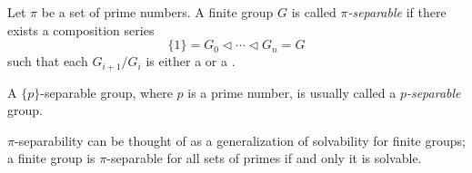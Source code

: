 \documentclass[12pt]{article}
\begin{document}
Let $\pi$ be a set of prime numbers.
A finite group $G$ is called \emph{$\pi$-separable}
if there exists a composition series
\[
  \{1\}=G_0\lhd\cdots\lhd G_n=G
\]
such that each $G_{i+1}/G_i$ is either
a 
or a .

A $\{p\}$-separable group, where $p$ is a prime number,
is usually called a \emph{$p$-separable} group.

$\pi$-separability can be thought of as
a generalization of solvability for finite groups;
a finite group is $\pi$-separable for all sets of primes
if and only it is solvable.
\end{document}
